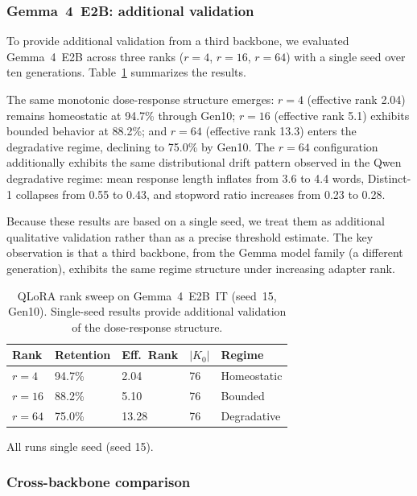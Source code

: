 \documentclass[a4paper,fleqn]{cas-dc}
\newif\ifshowchanges
\newcommand{\rev}[1]{\ifshowchanges{\color{blue}#1}\else{#1}\fi}
\begin{document}
\subsubsection{Gemma~4~E2B: additional validation}

To provide additional validation from a third backbone, we evaluated
Gemma~4~E2B across three ranks ($r=4$, $r=16$, $r=64$) with a single seed
over ten generations. Table~\ref{tab:gemma4} summarizes the results.

The same monotonic dose-response structure emerges: $r=4$ (effective rank 2.04)
remains homeostatic at 94.7\% through Gen10; $r=16$ (effective rank 5.1)
exhibits bounded behavior at 88.2\%; and $r=64$ (effective rank 13.3)
enters the degradative regime, declining to 75.0\% by Gen10. The $r=64$
configuration additionally exhibits the same distributional drift pattern
observed in the Qwen degradative regime: mean response length inflates from
3.6 to 4.4 words, Distinct-1 collapses from 0.55 to 0.43, and stopword ratio
increases from 0.23 to 0.28.

Because these results are based on a single seed, we treat them as additional
qualitative validation rather than as a precise threshold estimate. The key
observation is that a third backbone, from \rev{the Gemma model family (a different generation)}, exhibits
the same regime structure under increasing adapter rank.

\begin{table}[width=.95\linewidth,cols=5,pos=htbp]
\caption{QLoRA rank sweep on Gemma~4~E2B~IT (seed~15, Gen10). Single-seed
results provide additional validation of the dose-response
structure.}\label{tab:gemma4}
\begin{tabular*}{\tblwidth}{@{} lllll@{} }
\toprule
Rank & Retention & Eff.\ Rank & $|K_0|$ & Regime \\
\midrule
$r=4$   & 94.7\% & 2.04  & 76 & Homeostatic \\
$r=16$  & 88.2\% & 5.10  & 76 & Bounded \\
$r=64$  & 75.0\% & 13.28 & 76 & Degradative \\
\bottomrule
\end{tabular*}
\rev{{\footnotesize All runs single seed (seed 15).}}
\end{table}

\subsubsection{Cross-backbone comparison}
\end{document}
